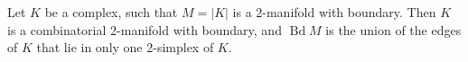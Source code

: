 Let $K$ be a complex, such that $M = |K|$ is a 2-manifold with boundary. Then $K$ is a combinatorial 2-manifold with boundary, and $\operatorname{Bd} M$ is the union of the edges of $K$ that lie in only one 2-simplex of $K$.

